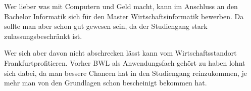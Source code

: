 Wer lieber was mit Computern und Geld macht, kann im Anschluss an den Bachelor Informatik sich f\"ur den Master Wirtschaftsinformatik bewerben. Da sollte man aber schon gut gewesen sein, da der Studiengang stark zulassungsbeschr\"ankt ist.

Wer sich aber davon nicht abschrecken l\"asst kann vom Wirtschaftsstandort Frankfurt\texttrademark{ }profitieren\texttrademark.
Vorher BWL als Anwendungsfach geh\"ort zu haben lohnt sich dabei, da man bessere Chancen hat in den Studiengang reinzukommen,
je mehr man von den Grundlagen schon bescheinigt bekommen hat.
